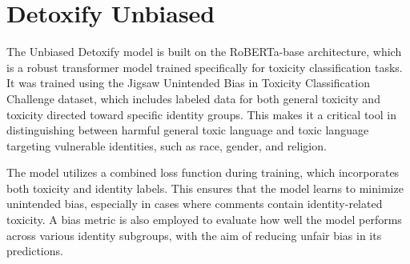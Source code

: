 \section{Detoxify Unbiased} \label{detoxify-unbiased}

The Unbiased Detoxify model is built on the RoBERTa-base architecture, which is a robust transformer model trained specifically for toxicity classification tasks. It was trained using the Jigsaw Unintended Bias in Toxicity Classification Challenge dataset, which includes labeled data for both general toxicity and toxicity directed toward specific identity groups. This makes it a critical tool in distinguishing between harmful general toxic language and toxic language targeting vulnerable identities, such as race, gender, and religion.

The model utilizes a combined loss function during training, which incorporates both toxicity and identity labels. This ensures that the model learns to minimize unintended bias, especially in cases where comments contain identity-related toxicity. A bias metric is also employed to evaluate how well the model performs across various identity subgroups, with the aim of reducing unfair bias in its predictions. \citep{detoxify:medium}